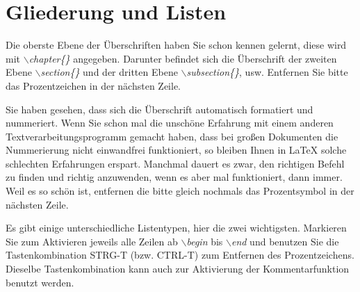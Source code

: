 \documentclass[ngerman]{book}	%
\begin{document}
\chapter{Gliederung und Listen}

Die oberste Ebene der Überschriften haben Sie schon kennen gelernt, diese wird mit \textit{\textit{$\backslash$chapter\{\}}} angegeben. Darunter befindet sich die Überschrift der zweiten Ebene \textit{\textit{$\backslash$section\{\}}} und der dritten Ebene \textit{$\backslash$subsection\{\}}, usw. Entfernen Sie bitte das Prozentzeichen in der nächsten Zeile.


Sie haben gesehen, dass sich die Überschrift automatisch formatiert und nummeriert. Wenn Sie schon mal die unschöne Erfahrung mit einem anderen Textverarbeitungsprogramm gemacht haben, dass bei großen Dokumenten die Nummerierung nicht einwandfrei funktioniert, so bleiben Ihnen in \LaTeX\; solche schlechten Erfahrungen erspart. Manchmal dauert es zwar, den richtigen Befehl zu finden und richtig anzuwenden, wenn es aber mal funktioniert, dann immer. Weil es so schön ist, entfernen die bitte gleich nochmals das Prozentsymbol in der nächsten Zeile.


Es gibt einige unterschiedliche Listentypen, hier die zwei wichtigsten. Markieren Sie zum Aktivieren jeweils alle Zeilen ab \textit{$\backslash$begin} bis \textit{$\backslash$end} und benutzen Sie die Tastenkombination STRG-T (bzw. CTRL-T) zum Entfernen des Prozentzeichens. Dieselbe Tastenkombination kann auch zur Aktivierung der Kommentarfunktion benutzt werden.


\end{document}

